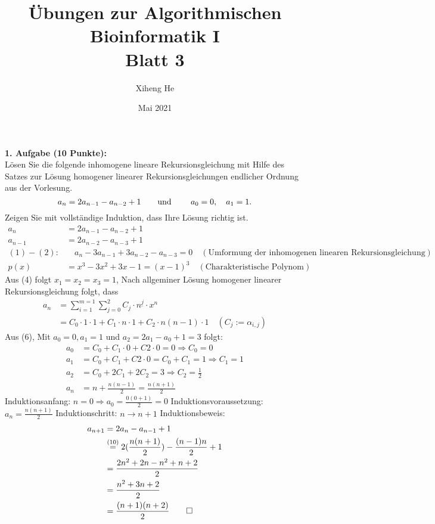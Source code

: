 \documentclass{article}
\title{Übungen zur Algorithmischen Bioinformatik I\\
Blatt 3}
\author{Xiheng He }
\date{Mai 2021}
\begin{document}
\maketitle
\begin{flushleft}
\textbf{1. Aufgabe (10 Punkte):}\\
Lösen Sie die folgende inhomogene lineare Rekursionsgleichung mit Hilfe des Satzes zur Lösung homogener 
linearer Rekursionsgleichungen endlicher Ordnung aus der Vorlesung.
\begin{equation*}
    a_n = 2a_{n-1} - a_{n-2} + 1 \text{\qquad und \qquad} a_0 = 0, \quad a_1 = 1.
\end{equation*}
Zeigen Sie mit vollständige Induktion, dass Ihre Lösung richtig ist.
\begin{align}
    a_n &= 2a_{n-1} - a_{n-2} + 1 \\
    a_{n-1} &= 2a_{n-2} - a_{n-3} + 1 \\
    (1) - (2):& \quad a_n - 3a_{n-1} + 3a_{n-2} - a_{n-3} = 0 \quad (\text{Umformung der inhomogenen linearen Rekursionsgleichung})\\
    p(x) &= x^3 - 3x^2 + 3x - 1 = (x-1)^3 \quad (\text{Charakteristische Polynom})
\end{align}
\newline
Aus (4) folgt $x_1 = x_2 = x_3 = 1$, Nach allgeminer Lösung homogener linearer Rekursionsgleichung folgt, dass
\begin{align}
    a_n &= \sum_{i = 1}^{m = 1}\sum_{j = 0}^{2} C_j \cdot n^{\underline{j}} \cdot x^n \\
        &= C_0 \cdot 1 \cdot 1 + C_1 \cdot n \cdot 1 + C_2 \cdot n(n-1) \cdot 1 \quad(C_j := \alpha_{i,j} )  
\end{align}
Aus (6), Mit $a_0 = 0, a_1 = 1$ und $a_2 = 2a_1 - a_0 + 1 = 3$ folgt:
\begin{align}
    a_0 &= C_0 + C_1 \cdot 0 + C2 \cdot 0 = 0 \Longrightarrow C_0 = 0\\
    a_1 & = C_0 + C_1 + C2 \cdot 0 = C_0 + C_1 = 1 \Longrightarrow C_1 = 1\\
    a_2 & = C_0 + 2C_1 + 2C_2 = 3 \Longrightarrow C_2 = \frac{1}{2}\\
    a_n & = n + \frac{n(n-1)}{2} = \frac{n(n+1)}{2}
\end{align}
Induktionsanfang: $n=0 \Longrightarrow a_0 = \displaystyle\frac{0(0+1)}{2} = 0$
\newline
Induktionsvoraussetzung: $a_n = \displaystyle\frac{n(n+1)}{2}$
\newline
Induktionschritt: $n \longrightarrow n+1$
\newline
Induktionsbeweis:
\begin{align*}
    a_{n+1} &= 2a_n - a_{n-1} + 1\\
    &\overset{(10)}{=} 2(\frac{n(n+1)}{2}) - \frac{(n-1)n}{2} + 1\\ 
    &= \frac{2n^2 + 2n - n^2 + n + 2}{2}\\
    &= \frac{n^2 + 3n +2}{2}\\
    &= \frac{(n+1)(n+2)}{2} \qed
\end{align*}
\end{flushleft}
\end{document}
